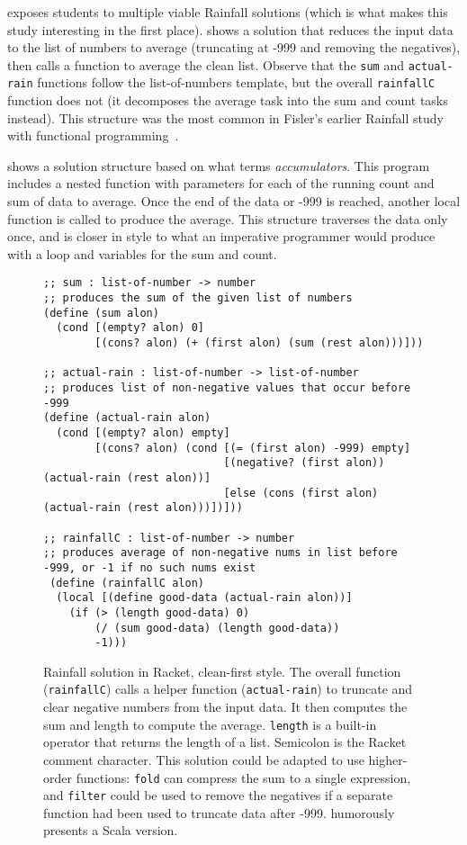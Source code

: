 \htdp exposes students to multiple viable
Rainfall solutions (which is what makes this study interesting in the
first place).  shows a solution that
reduces the input data to the list of numbers to average (truncating
at -999 and removing the negatives), then calls a function to average
the clean list.  Observe that the \lstinline{sum} and \lstinline{actual-rain}
functions follow the list-of-numbers template, but the overall
\lstinline{rainfallC} function does not (it decomposes the average task
into the sum and count tasks instead). This structure was the most
common in Fisler's earlier Rainfall study with functional programming~\cite{fisler-recurring-rainfall14}.

 shows a solution structure
based on what \htdp terms \emph{accumulators}. This program includes a
nested function with parameters for each of the running count and sum
of data to average.  Once the end of the data or -999 is reached,
another local function is called to produce the average.  This
structure traverses the data only once, and is closer in style to what
an imperative programmer would produce with a loop and variables for
the sum and count.

\begin{figure*}
\begin{lstlisting}
;; sum : list-of-number -> number
;; produces the sum of the given list of numbers
(define (sum alon)
  (cond [(empty? alon) 0]
        [(cons? alon) (+ (first alon) (sum (rest alon)))]))

;; actual-rain : list-of-number -> list-of-number
;; produces list of non-negative values that occur before -999
(define (actual-rain alon)
  (cond [(empty? alon) empty]
        [(cons? alon) (cond [(= (first alon) -999) empty]
                            [(negative? (first alon)) (actual-rain (rest alon))]
                            [else (cons (first alon) (actual-rain (rest alon)))])]))

;; rainfallC : list-of-number -> number
;; produces average of non-negative nums in list before -999, or -1 if no such nums exist
 (define (rainfallC alon)
  (local [(define good-data (actual-rain alon))]
    (if (> (length good-data) 0)
        (/ (sum good-data) (length good-data))
        -1)))
\end{lstlisting}
\caption{Rainfall solution in Racket, clean-first style.  The overall
  function (\lstinline{rainfallC}) calls a helper function
  (\lstinline{actual-rain}) to truncate and
  clear negative numbers from the input data.  It then computes the
  sum and length to compute the average.  \lstinline{length} is a
  built-in operator that returns the length of a list.  Semicolon is the Racket
  comment character. This solution could be adapted to use
  higher-order functions: \lstinline{fold} can compress the sum
  to a single expression, and \lstinline{filter} could be
  used to remove the negatives if a separate function had been used to
  truncate data after -999. \cite{sorva-break-considered-inroads16} humorously presents a Scala version.}
\label{f:rainfall-cleanfirst}
\end{figure*}

